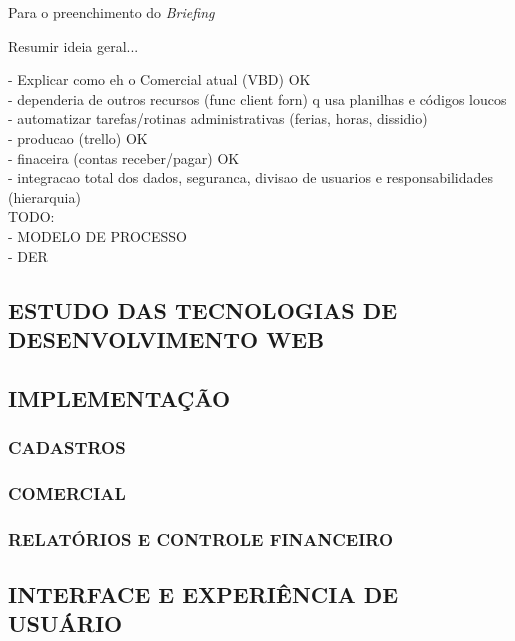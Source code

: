 \documentclass[
  12pt,				%
  openany,
  oneside,
  a4paper,			%
  english,			%
  brazil
]{article}
\numberwithin{figure}{section}
\numberwithin{table}{section}
\begin{document}
Para o preenchimento do \textit{Briefing}




Resumir ideia geral...




\noindent
- Explicar como eh o Comercial atual (VBD) OK \\
- dependeria de outros recursos (func client forn) q usa planilhas e códigos loucos  \\
- automatizar tarefas/rotinas administrativas (ferias, horas, dissidio) \\
- producao (trello) OK \\
- finaceira (contas receber/pagar) OK \\
- integracao total dos dados, seguranca, divisao de usuarios e responsabilidades (hierarquia) \\




\noindent TODO: \\
- MODELO DE PROCESSO \\
- DER \\







\subsection{ESTUDO DAS TECNOLOGIAS DE DESENVOLVIMENTO WEB}

\subsection{IMPLEMENTAÇÃO}

  \subsubsection{CADASTROS}
  
  \subsubsection{COMERCIAL}
  
  \subsubsection{RELATÓRIOS E CONTROLE FINANCEIRO}


\subsection{INTERFACE E EXPERIÊNCIA DE USUÁRIO}
\end{document}
